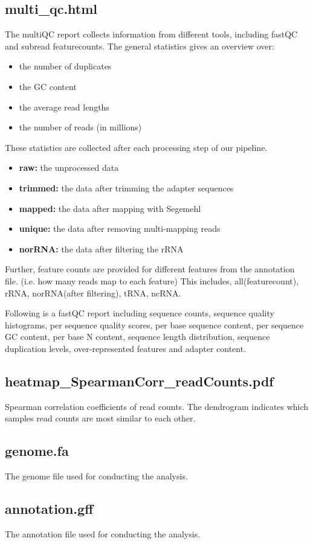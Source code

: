 \documentclass[10pt,a4paper]{article}
\begin{document}
\subsection*{multi\_qc.html}
The multiQC report collects information from different tools, including fastQC and subread featurecounts.
The general statistics gives an overview over:
\begin{itemize}
\item the number of duplicates
\item the GC content
\item the average read lengths
\item the number of reads (in millions)
\end{itemize}
These statistics are collected after each processing step of our pipeline. 
\begin{itemize}
\item \textbf{raw:} the unprocessed data
\item \textbf{trimmed:} the data after trimming the adapter sequences
\item \textbf{mapped:} the data after mapping with Segemehl
\item \textbf{unique:} the data after removing multi-mapping reads
\item \textbf{norRNA:} the data after filtering the rRNA
\end{itemize}
Further, feature counts are provided for different features from the annotation file. (i.e. how many reads map to each feature)
This includes, all(featurecount), rRNA, norRNA(after filtering), tRNA, ncRNA.

Following is a fastQC report including sequence counts, sequence quality histograms, per sequence quality scores, per base sequence content, per sequence GC content, per base N content, sequence length distribution, sequence duplication levels, over-represented features and adapter content.

\subsection*{heatmap\_SpearmanCorr\_readCounts.pdf}
Spearman correlation coefficients of read counts. The dendrogram indicates which samples read counts are most similar to each other.
\subsection*{genome.fa}
The genome file used for conducting the analysis.
\subsection*{annotation.gff}
The annotation file used for conducting the analysis.
\end{document}
